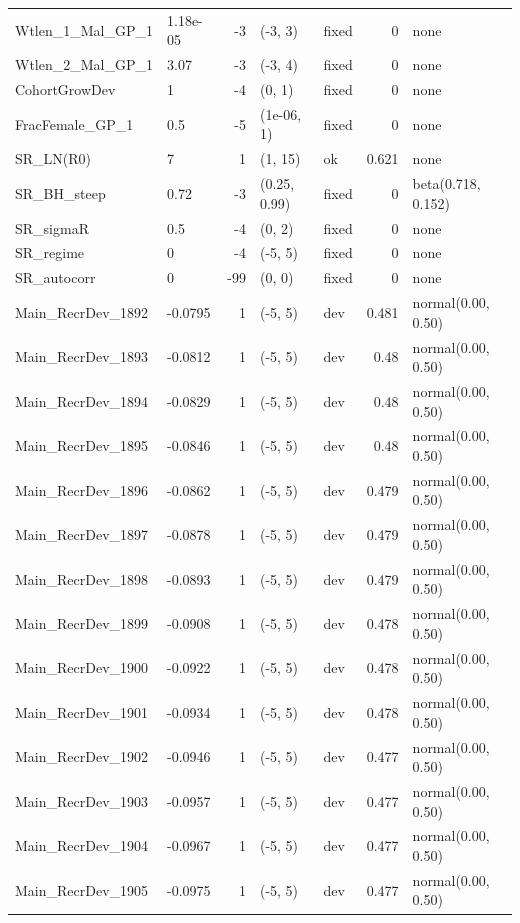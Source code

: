 \documentclass[
]{scrartcl}
\begin{document}
\begin{longtable}{llrllrl}
Wtlen\_1\_Mal\_GP\_1 & 1.18e-05 & -3 & (-3, 3) & fixed & 0 & none \\ 
Wtlen\_2\_Mal\_GP\_1 & 3.07 & -3 & (-3, 4) & fixed & 0 & none \\ 
CohortGrowDev & 1 & -4 & (0, 1) & fixed & 0 & none \\ 
FracFemale\_GP\_1 & 0.5 & -5 & (1e-06, 1) & fixed & 0 & none \\ 
SR\_LN(R0) & 7 & 1 & (1, 15) & ok & 0.621 & none \\ 
SR\_BH\_steep & 0.72 & -3 & (0.25, 0.99) & fixed & 0 & beta(0.718, 0.152) \\ 
SR\_sigmaR & 0.5 & -4 & (0, 2) & fixed & 0 & none \\ 
SR\_regime & 0 & -4 & (-5, 5) & fixed & 0 & none \\ 
SR\_autocorr & 0 & -99 & (0, 0) & fixed & 0 & none \\ 
Main\_RecrDev\_1892 & -0.0795 & 1 & (-5, 5) & dev & 0.481 & normal(0.00, 0.50) \\ 
Main\_RecrDev\_1893 & -0.0812 & 1 & (-5, 5) & dev & 0.48 & normal(0.00, 0.50) \\ 
Main\_RecrDev\_1894 & -0.0829 & 1 & (-5, 5) & dev & 0.48 & normal(0.00, 0.50) \\ 
Main\_RecrDev\_1895 & -0.0846 & 1 & (-5, 5) & dev & 0.48 & normal(0.00, 0.50) \\ 
Main\_RecrDev\_1896 & -0.0862 & 1 & (-5, 5) & dev & 0.479 & normal(0.00, 0.50) \\ 
Main\_RecrDev\_1897 & -0.0878 & 1 & (-5, 5) & dev & 0.479 & normal(0.00, 0.50) \\ 
Main\_RecrDev\_1898 & -0.0893 & 1 & (-5, 5) & dev & 0.479 & normal(0.00, 0.50) \\ 
Main\_RecrDev\_1899 & -0.0908 & 1 & (-5, 5) & dev & 0.478 & normal(0.00, 0.50) \\ 
Main\_RecrDev\_1900 & -0.0922 & 1 & (-5, 5) & dev & 0.478 & normal(0.00, 0.50) \\ 
Main\_RecrDev\_1901 & -0.0934 & 1 & (-5, 5) & dev & 0.478 & normal(0.00, 0.50) \\ 
Main\_RecrDev\_1902 & -0.0946 & 1 & (-5, 5) & dev & 0.477 & normal(0.00, 0.50) \\ 
Main\_RecrDev\_1903 & -0.0957 & 1 & (-5, 5) & dev & 0.477 & normal(0.00, 0.50) \\ 
Main\_RecrDev\_1904 & -0.0967 & 1 & (-5, 5) & dev & 0.477 & normal(0.00, 0.50) \\ 
Main\_RecrDev\_1905 & -0.0975 & 1 & (-5, 5) & dev & 0.477 & normal(0.00, 0.50) \\ 

\end{longtable}
\end{document}
